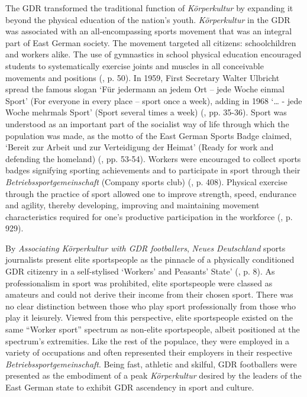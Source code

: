 The GDR transformed the traditional function of \textit{Körperkultur} by expanding it beyond the physical education of the nation’s youth. \textit{Körperkultur} in the GDR was associated with an all-encompassing sports movement that was an integral part of East German society. The movement targeted all citizens: schoolchildren and workers alike. The use of gymnastics in school physical education encouraged students to systematically exercise joints and muscles in all conceivable movements and positions (\cite{reinhartkrüger2007}, p. 50). In 1959, First Secretary Walter Ulbricht spread the famous slogan ‘Für jedermann an jedem Ort – jede Woche einmal Sport’ (For everyone in every place – sport once a week), adding in 1968 ‘… - jede Woche mehrmals Sport’ (Sport several times a week) (\cite{bernett1994}, pp. 35-36). Sport was understood as an important part of the socialist way of life through which the population was made, as the motto of the East German Sports Badge claimed, ‘Bereit zur Arbeit und zur Verteidigung der Heimat’ (Ready for work and defending the homeland) (\cite{reinhartkrüger2007}, pp. 53-54). Workers were encouraged to collect sports badges signifying sporting achievements and to participate in sport through their \textit{Betriebssportgemeinschaft} (Company sports club) (\cite{grix2008}, p. 408). Physical exercise through the practice of sport allowed one to improve strength, speed, endurance and agility, thereby developing, improving and maintaining movement characteristics required for one’s productive participation in the workforce (\cite{sieger1964}, p. 929).

By \textit{Associating Körperkultur with GDR footballers}, \textit{Neues Deutschland} sports journalists present elite sportspeople as the pinnacle of a physically conditioned GDR citizenry in a self-stylised ‘Workers’ and Peasants’ State’ (\cite{majorosmond2002}, p. 8). As professionalism in sport was prohibited, elite sportspeople were classed as amateurs and could not derive their income from their chosen sport. There was no clear distinction between those who play sport professionally from those who play it leisurely. Viewed from this perspective, elite sportspeople existed on the same “Worker sport” spectrum as non-elite sportspeople, albeit positioned at the spectrum’s extremities. Like the rest of the populace, they were employed in a variety of occupations and often represented their employers in their respective \textit{Betriebssportgemeinschaft}. Being fast, athletic and skilful, GDR footballers were presented as the embodiment of a peak \textit{Körperkultur} desired by the leaders of the East German state to exhibit GDR ascendency in sport and culture.


